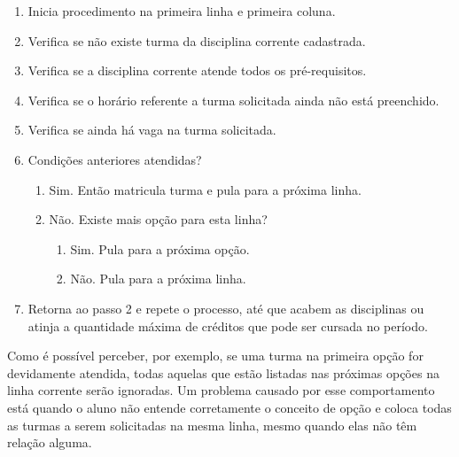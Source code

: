 \documentclass[graduacao,brazil]{ThesisPUC}
\begin{document}
\begin{enumerate}

	\item Inicia procedimento na primeira linha e primeira coluna.

	\item Verifica se não existe turma da disciplina corrente cadastrada.

	\item Verifica se a disciplina corrente atende todos os pré-requisitos.

	\item Verifica se o horário referente a turma solicitada ainda não está preenchido.

	\item Verifica se ainda há vaga na turma solicitada.

	\item Condições anteriores atendidas?

	\begin{enumerate}

		\item  Sim. Então matricula turma e pula para a próxima linha. 

		\item  Não. Existe mais opção para esta linha?

		\begin{enumerate}

			\item Sim. Pula para a próxima opção.

			\item Não. Pula para a próxima linha.

		\end{enumerate}


	\end{enumerate}

	\item Retorna ao passo 2 e repete o processo, até que acabem as disciplinas ou atinja a quantidade máxima de créditos que pode ser cursada no período.

\end{enumerate}

Como é possível perceber, por exemplo, se uma turma na primeira opção for devidamente atendida, todas aquelas que estão listadas nas próximas opções na linha corrente serão ignoradas. Um problema causado por esse comportamento está quando o aluno não entende corretamente o conceito de opção e coloca todas as turmas a serem solicitadas na mesma linha, mesmo quando elas não têm relação alguma.
\end{document}
